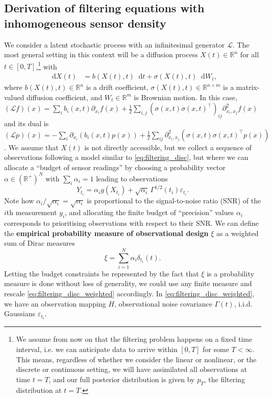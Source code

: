 \documentclass[10pt]{article}
\numberwithin{equation}{section}
\numberwithin{figure}{section}
\theoremstyle{remark}
\newcommand{\cL}{\mathcal L}
\newcommand{\dd }{\mathop{}\!\mathrm{d}}
\newcommand{\R}{\mathbb R}
\newcommand{\eps}{\varepsilon}
\begin{document}
\subsection{Derivation of filtering equations with inhomogeneous sensor density}\label{sec:derivation_weighted}
We consider a latent stochastic process with an infinitesimal generator $\cL$. The most general setting in this context will be a diffusion process $X(t)\in \R^n$ for all $t \in [0,T]$,\footnote{We assume from now on that the filtering problem happens on a fixed time interval, i.e. we can anticipate data to arrive within $[0,T]$ for some $T<\infty$. This means, regardless of whether we consider the linear or nonlinear, or the discrete or continuous setting, we will have assimilated all observations at time $t=T$, and our full posterior distribution is given by $p_T$, the filtering distribution at $t=T$.} with
\begin{align}
    \dd X(t) &= b(X(t),t)\dd t + \sigma(X(t),t)\dd W_t,
\end{align}
where $b(X(t),t)\in \R^n$ is a drift coefficient, $\sigma(X(t),t)\in \R^{n\times m}$ is a matrix-valued diffusion coefficient, and $W_t\in \R^{m}$ is Brownian motion. In this case, $(\cL f)(x) = \sum_i b_i(x,t) \partial_{x_i}f(x) + \frac{1}{2}\sum_{i,j}(\sigma(x,t)\sigma(x,t)^\top)_{ij}\partial^2_{x_i,x_j}f(x)$ and its dual is $(\cL p)(x) = -\sum_i \partial_{x_i}(b_i(x,t)p(x)) + \frac{1}{2}\sum_{ij}\partial^2_{x_i,x_j}(\sigma(x,t)\sigma(x,t)^\top p(x))$. We assume that $X(t)$ is not directly accessible, but we collect a sequence of observations following a model similar to \eqref{eq:filtering_disc}, but where we can allocate a ``budget of sensor readings'' by choosing a probability vector $\alpha \in (\R^+)^N$ with $\sum_i \alpha_i = 1$ leading to observations
\begin{equation}\label{eq:filtering_disc_weighted}
    Y_{t_i} = \alpha_i g(X_{t_i}) + \sqrt{\alpha_i }\, \Gamma^{1/2}(t_i)\eps_{t_i}.
\end{equation}
Note how $\alpha_i/\sqrt{\alpha_i} = \sqrt{\alpha_i}$ is proportional to the signal-to-noise ratio (SNR) of the $i$th measurement $y_i$, and allocating the finite budget of ``precision'' values $\alpha_i$ corresponds to prioritising observations with respect to their SNR.  We can define the \textbf{empirical probability measure of observational design} $\xi$ as a weighted sum of Dirac measures
\begin{equation}
    \xi = \sum_{i=1}^N \alpha_i \delta_{t_i}(t).
\end{equation}
Letting the budget constraints be represented by the fact that $\xi$ is a probability measure is done without loss of generality, we could use any finite measure and rescale \eqref{eq:filtering_disc_weighted} accordingly.
In \eqref{eq:filtering_disc_weighted}, we have an observation mapping $H$, observational noise covariance $\Gamma(t)$, i.i.d. Gaussians $\eps_{t_i}$. 
\end{document}
